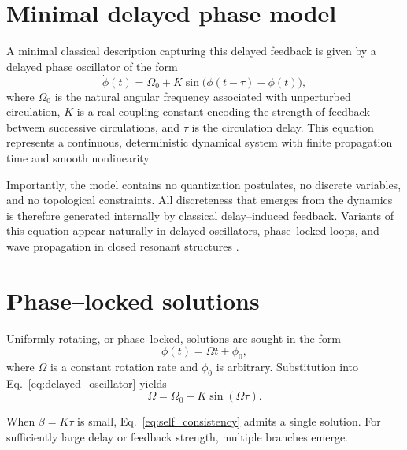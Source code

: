 \documentclass[11pt,a4paper]{article}
\begin{document}
        

    \section{Minimal delayed phase model}
        A minimal classical description capturing this delayed feedback is given by a delayed phase oscillator of the form
        \begin{equation}
            \dot{\phi}(t) = \Omega_0 + K \sin\big(\phi(t-\tau) - \phi(t)\big),
            \label{eq:delayed_oscillator}
        \end{equation}
        where $\Omega_0$ is the natural angular frequency associated with unperturbed circulation, $K$ is a real coupling constant encoding the strength of feedback between successive circulations, and $\tau$ is the circulation delay. This equation represents a continuous, deterministic dynamical system with finite propagation time and smooth nonlinearity.

        Importantly, the model contains no quantization postulates, no discrete variables, and no topological constraints. All discreteness that emerges from the dynamics is therefore generated internally by classical delay--induced feedback. Variants of this equation appear naturally in delayed oscillators, phase--locked loops, and wave propagation in closed resonant structures \cite{Erneux2009,Earl2003,Gardner2005,Ikeda1979}.

    \section{Phase--locked solutions}

        Uniformly rotating, or phase--locked, solutions are sought in the form
        \begin{equation}
            \phi(t) = \Omega t + \phi_0,
            \label{eq:ansatz}
        \end{equation}
        where $\Omega$ is a constant rotation rate and $\phi_0$ is arbitrary.
        Substitution into Eq.~\ref{eq:delayed_oscillator} yields
        \begin{equation}
            \Omega = \Omega_0 - K \sin(\Omega\tau).
            \label{eq:self_consistency}
        \end{equation}

        When $\beta=K\tau$ is small, Eq.~\ref{eq:self_consistency} admits a single solution.
        For sufficiently large delay or feedback strength, multiple branches emerge.
\end{document}

